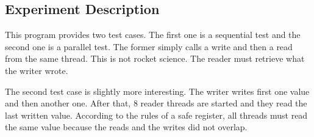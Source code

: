 \subsection{Experiment Description}
\par
This program provides two test cases. The first one is a sequential test and the
second one is a parallel test. The former simply calls a write and then a read
from the same thread. This is not rocket science. The reader must retrieve what
the writer wrote.
\par
The second test case is slightly more interesting. The writer writes first one
value and then another one. After that, 8 reader threads are started and they
read the last written value. According to the rules of a safe register, all
threads must read the same value because the reads and the writes did not
overlap.
\par
